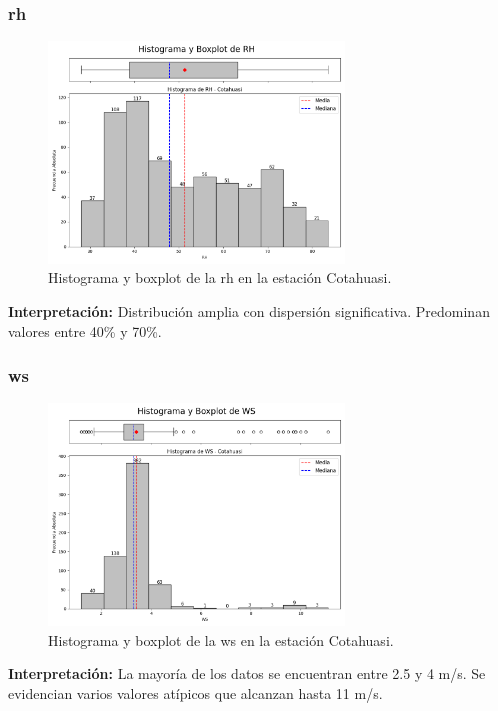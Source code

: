 \subsubsection*{\gls{rh} }
\begin{figure}[htbp]
\centering
\includegraphics[width=0.7\textwidth]{resultados/por_estacion_meteorologica/Cotahuasi/RH_histograma.png}
\caption{Histograma y boxplot de la \gls{rh}  en la estación Cotahuasi.}
\label{fig:cotahuasi_RH}
\end{figure}
\textbf{Interpretación:} Distribución amplia con dispersión significativa. Predominan valores entre 40\% y 70\%.

\subsubsection*{\gls{ws} }
\begin{figure}[htbp]
\centering
\includegraphics[width=0.7\textwidth]{resultados/por_estacion_meteorologica/Cotahuasi/WS_histograma.png}
\caption{Histograma y boxplot de la \gls{ws}  en la estación Cotahuasi.}
\label{fig:cotahuasi_WS}
\end{figure}
\textbf{Interpretación:} La mayoría de los datos se encuentran entre 2.5 y 4 m/s. Se evidencian varios valores atípicos que alcanzan hasta 11 m/s.

